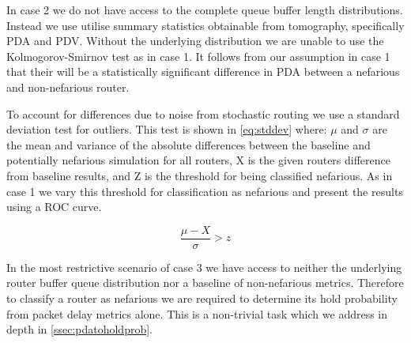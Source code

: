   In case 2 we do not have access to the complete queue buffer length distributions. Instead we use utilise summary statistics obtainable from tomography, specifically PDA and PDV. Without the underlying distribution we are unable to use the Kolmogorov-Smirnov test as in case 1. It follows from our assumption in case 1 that their will be a statistically significant difference in PDA between a nefarious and non-nefarious router.\par
  To account for differences due to noise from stochastic routing we use a standard deviation test for outliers. This test is shown in \cref{eq:stddev} where: $\mu$ and $\sigma$ are the mean and variance of the absolute differences between the baseline and potentially nefarious simulation for all routers, X is the given routers difference from baseline results, and Z is the threshold for being classified nefarious. As in case 1 we vary this threshold for classification as nefarious and present the results using a ROC curve.\par
  
  \begin{equation}
  \label{eq:stddev}
      \frac{\mu-X}{\sigma}>z
  \end{equation}
  
  In the most restrictive scenario of case 3 we have access to neither the underlying router buffer queue distribution nor a baseline of non-nefarious metrics. Therefore to classify a router as nefarious we are required to determine its hold probability from packet delay metrics alone. This is a non-trivial task which we address in depth in \cref{ssec:pdatoholdprob}.\par
  
